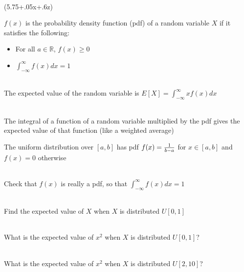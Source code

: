 \documentclass[10pt]{seminar}
\begin{document}
\begin{slide}
\ \\(5.75+.05x+.6z)
\newslide

$f(x)$ is the probability density function (pdf) of a random variable $X$ if it satisfies the following: 

\begin{itemize}
\item For all $a\in \mathbb{R}$, $f(x)\geq 0$
\item $\int_{-\infty}^{\infty}f(x)dx =1$
\end{itemize}

\ \\The expected value of the random variable is $E[X]=\int_{-\infty}^{\infty}x f(x) dx$

\ \\The integral of a function of a random variable multiplied by the pdf gives the expected value of that function (like a weighted average)

\newslide

The uniform distribution over $[a, b]$ has pdf $f(x)={1\over{b-a}}$ for $x\in [a,b]$ and $f(x)=0$ otherwise

\ \\Check that $f(x)$ is really a pdf, so that $\int_{-\infty}^{\infty}f(x) dx =1$

\ \\Find the expected value of $X$ when $X$ is distributed  $U[0, 1]$

\ \\What is the expected value of $x^2$ when $X$ is distributed $U[0, 1]$?

\ \\What is the expected value of $x^2$ when $X$ is distributed $U[2, 10]$?


 \end{slide}
 
 
\end{document}
